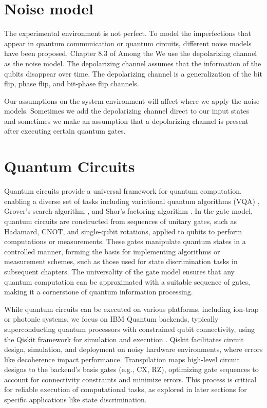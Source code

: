 
\section{Noise model}

The experimental environment is not perfect. To model the imperfections that
appear in quantum communication or quantum circuits, different noise models
have been proposed. Chapter 8.3 of \cite{qcqi}
Among the We use the depolarizing channel as the noise model.
The depolarizing channel assumes that the information of the qubits disappear over time.
The depolarizing channel is a generalization of the bit flip, phase flip, and bit-phase flip channels.

Our assumptions on the system environment will affect where we apply the noise
models. Sometimes we add the depolarizing channel direct to our input states
and sometimes we make an assumption that a depolarizing channel is present
after executing certain quantum gates.

\section{Quantum Circuits}
Quantum circuits provide a universal framework for quantum computation,
enabling a diverse set of tasks including variational quantum algorithms (VQA)
\cite{peruzzo2014variational}, Grover’s search algorithm \cite{grover1996fast},
and Shor’s factoring algorithm \cite{shor1994algorithms}.
In the gate model, quantum circuits are constructed from sequences of unitary
gates, such as Hadamard, CNOT, and single-qubit rotations, applied to qubits
to perform computations or measurements.
These gates manipulate quantum states in a controlled manner, forming the
basis for implementing algorithms or measurement schemes, such as those used
for state discrimination tasks in subsequent chapters.
The universality of the gate model ensures that any quantum computation can be
approximated with a suitable sequence of gates, making it a cornerstone of
quantum information processing.

While quantum circuits can be executed on various platforms, including
ion-trap or photonic systems, we focus on IBM Quantum backends, typically
superconducting quantum processors with constrained qubit connectivity, using
the Qiskit framework for simulation and execution \cite{qiskit2023}.
Qiskit facilitates circuit design, simulation, and deployment on noisy
hardware environments, where errors like decoherence impact performance.
Transpilation maps high-level circuit designs to the backend’s basis gates
(e.g., CX, RZ), optimizing gate sequences to account for connectivity
constraints and minimize errors.
This process is critical for reliable execution of computational tasks, as
explored in later sections for specific applications like state discrimination.

